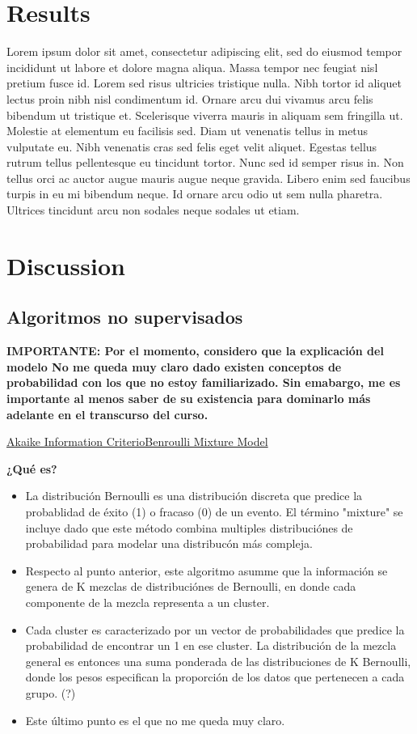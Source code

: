 \documentclass[twocolumn]{bmcart}%
\begin{document}
\section*{Results}
Lorem ipsum dolor sit amet, consectetur adipiscing elit, sed do eiusmod tempor incididunt ut labore et dolore magna aliqua. Massa tempor nec feugiat nisl pretium fusce id. Lorem sed risus ultricies tristique nulla. Nibh tortor id aliquet lectus proin nibh nisl condimentum id. Ornare arcu dui vivamus arcu felis bibendum ut tristique et. Scelerisque viverra mauris in aliquam sem fringilla ut. Molestie at elementum eu facilisis sed. Diam ut venenatis tellus in metus vulputate eu. Nibh venenatis cras sed felis eget velit aliquet. Egestas tellus rutrum tellus pellentesque eu tincidunt tortor. Nunc sed id semper risus in. Non tellus orci ac auctor augue mauris augue neque gravida. Libero enim sed faucibus turpis in eu mi bibendum neque. Id ornare arcu odio ut sem nulla pharetra. Ultrices tincidunt arcu non sodales neque sodales ut etiam.


\section*{Discussion}
\subsection*{Algoritmos no supervisados}

\textbf{IMPORTANTE: Por el momento, considero que la explicación del modelo No me queda muy claro dado existen conceptos de probabilidad con los que no estoy familiarizado. Sin emabargo, me es importante al menos saber de su existencia para dominarlo más adelante en el transcurso del curso.}


\href{https://stats.stackexchange.com/questions/89535/what-algorithm-should-i-use-to-cluster-a-huge-binary-dataset-into-few-categories#:~:text=A%20classic%20algorithm%20for%20binary,powerful%20but%20also%20more%20difficult.}{Akaike Information CriterioBenroulli Mixture Model}

\textbf{¿Qué es?}
\begin{itemize}
    \item  La distribución Bernoulli es una distribución discreta que predice la probablidad de éxito (1) o fracaso (0) de un evento. El término "mixture" se incluye dado que este método combina multiples distribuciónes de probabilidad para modelar una distribucón más compleja. 
    \item Respecto al punto anterior, este algoritmo asumme que la información se genera de K mezclas de distribuciónes de Bernoulli, en donde cada componente de la mezcla representa a un cluster.
    \item Cada cluster es caracterizado por un vector de probabilidades que predice la probabilidad de encontrar un 1 en ese cluster. La distribución de la mezcla general es entonces una suma ponderada de las distribuciones de K Bernoulli, donde los pesos especifican la proporción de los datos que pertenecen a cada grupo. (?) 
     \item Este último punto es el que no me queda muy claro.
\end{itemize}
\end{document}
